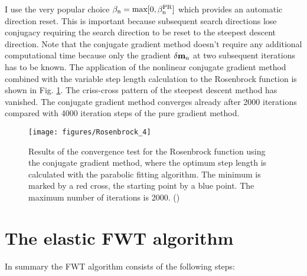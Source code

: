 I use the very popular choice $\rm{\beta_n = max[0,\beta_n^{PR}]}$ which provides an automatic direction reset. This is important because subsequent search directions lose conjugacy requiring the search direction to be reset to the steepest descent direction. Note that the conjugate gradient method doesn't require any additional computational time because only the gradient $\rm{\delta \mathbf{m}_n}$ at two subsequent iterations has to be known. The application of the nonlinear conjugate gradient method combined with the variable step length calculation to the Rosenbrock function is shown in Fig. \ref{Rosenbrock_cg}. The criss-cross pattern of the steepest descent method has vanished. The conjugate gradient method converges already after 2000 iterations compared with 4000 iteration steps of the pure gradient method.   

\begin{figure}[ht]
\texttt{[image: figures/Rosenbrock\_4]}\\
\caption{Results of the convergence test for the Rosenbrock function using the conjugate gradient method, where the optimum step length is calculated with the parabolic fitting algorithm. The minimum is marked by a red cross, the starting point by a blue point. The maximum number of iterations is 2000. (\cite{koehn:11})}
\label{Rosenbrock_cg}
\end{figure}

\clearpage
\section{The elastic FWT algorithm}
In summary the FWT algorithm consists of the following steps:


